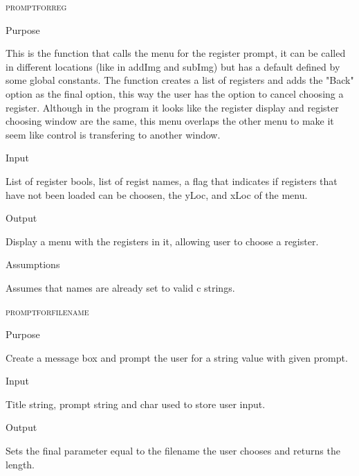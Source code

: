 \documentclass[pdftex, 11pt]{article}
\begin{document}
\begin{description}
\begin{description}
		\end{description}



	\item{\textsc{promptforreg}}
		\begin{description}
			\item{Purpose}
				
				This is the function that calls the menu for the register prompt, it can be
				called in different locations (like in addImg and subImg) but has a default
				defined by some global constants.  The function creates a list of registers
				and adds the "Back" option as the final option, this way the user has the
				option to cancel choosing a register.  Although in the program it looks like
				the register display and register choosing window are the same, this menu
				overlaps the other menu to make it seem like control is transfering to another
				window.

			\item{Input}

				List of register bools, list of regist names, a flag that
				indicates if registers that have not been loaded can be
				choosen, the yLoc, and xLoc of the menu.

			\item{Output}
				
				Display a menu with the registers in it, allowing user to
				choose a register.

			\item{Assumptions}

				Assumes that names are already set to valid c strings.

		\end{description}



	\item{\textsc{promptforfilename}}
		\begin{description}
			\item{Purpose}

				Create a message box and prompt the user for a string value with given prompt.

			\item{Input}

				Title string, prompt string and char used to store user
				input.

			\item{Output}

				Sets the final parameter equal to the filename the user
				chooses and returns the length.


\end{description}
\end{description}
\end{document}
